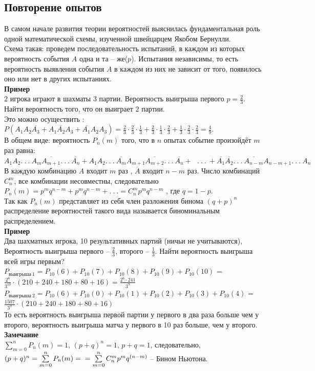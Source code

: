 \documentclass[russian, 12pt, fleqn]{article}
\begin{document}
\subsection{Повторение опытов}
\noindent
В самом начале развития теории вероятностей выяснилась фундаментальная роль одной математической схемы, изученной швейцарцем Якобом Бернулли.\\
Схема такая: проведем последовательность испытаний, в каждом из которых вероятность события $A$ одна и та -- же($p$). Испытания независимы, то есть вероятность выявления события $A$ в каждом из них не зависит от того, появилось оно или нет в других испытаниях.\\
\textbf{Пример\ }\\ $2$ игрока играют в шахматы $3$ партии. Вероятность выигрыша первого $p = \frac{2}{3}$. Найти вероятность того, что он выиграет $2$ партии.\\
Это можно осуществить : \\
$P(A_1A_2\overline{A_3} + A_1\overline{A_2}A_3 + \overline{A_1}A_2A_3)=\frac{2}{3}\cdot\frac{2}{3}\cdot\frac{1}{3} + \frac{2}{3}\cdot\frac{1}{3}\cdot\frac{2}{3} + \frac{1}{3}\cdot\frac{2}{3}\cdot\frac{2}{3} = \frac{4}{9}.$\\
В общем виде: вероятность $P_n(m)$  того, что в $n$ опытах событие произойдёт $m$ раз равна: $A_1A_2.\ . \ . \ A_m\overline{A_{m+1}}.\ .\ .\ \overline{A_n} + 
A_1A_2.\ . \ . \ \overline{A_m} A_{m+1} \overline{A_{m+2}} .\ .\ .\ \overline{A_n} +
\ \ \ .\ .\ .\ 
+\overline{A_1}\overline{A_2}.\ . \ . \ \overline{A_{n-m}} {A_{n-m+1}} .\ .\ .\ A_n$
В каждую комбинацию $A$ входит $m$ раз ,  $\overline{A}$ входит $n - m$ раз.
Число комбинаций $C^m_n$, все комбинации несовместны, следовательно $P_n(m) = p^mq^{n-m} + p^mq^{n-m} + .\ .\ . = C^m_np^mq^{n-m}$ , где $q = 1 - p$.\\
Так как ${P_n(m)}$ представляет из себя член разложения бинома {$(q+p)^n$}\\
 распределение вероятностей такого вида называется биноминальным распределением.\\
\textbf{Пример\ }\\
Два шахматных игрока, 10 результативных партий (ничьи не учитываются), Вероятность выигрыша первого -- $\frac{2}{3}$, второго -- $\frac{1}{3}$. Найти вероятность выигрыша
 всей игры первым?\\
$P_{выигрыша\ 1} = P_{10}(6) + P_{10}(7) + P_{10}(8) + P_{10}(9) +  P_{10}(10)$ = $\frac{2^6}{3^{10}}\cdot(210+240+180+80+16) = \frac{2^6\cdot241}{3^{9}}$
$P_{выигрыша\ 2} = P_{10}(6) + P_{10}(0) + P_{10}(1) + P_{10}(2) +  P_{10}(3)  +  P_{10}(4)$ = $\frac{1507}{3^{9}}\cdot(210+240+180+80+16)$\\
То есть вероятность выигрыша первой партии у первого в два раза больше чем у второго, вероятность выигрыша матча у первого в 10 раз больше, чем у второго.\\
\textbf{Замечание\ } \\
$\sum\limits_{m = 0}^{n}P_n(m) = 1$, $(p+q)^n=1$, $p+q = 1$, следовательно, $(p+q)^n = \sum\limits_{m = 0}^{n}P_n(m)  =\\= \sum\limits_{m = 0}^{n}C^m_np^mq^{(n-m)}$ -- Бином Ньютона.\\
\end{document}
